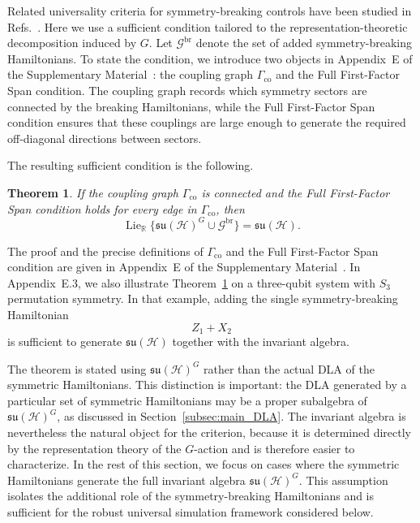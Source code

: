 \documentclass[10pt,twocolumn,superscriptaddress,aps,amsmath,amssymb,citeautoscript,floatfix,prx,longbibliography]{revtex4-2}
\newcounter{alg}
\newtheorem{theorem}{Theorem}
\theoremstyle{plain}
\theoremstyle{plain}
\theoremstyle{plain}
\theoremstyle{plain}
\theoremstyle{plain}
\theoremstyle{plain}
\begin{document}
Related universality criteria for symmetry-breaking controls have been studied in Refs.~\cite{Hu2025, AlbertiniDAlessandro2025}. Here we use a sufficient condition tailored to the representation-theoretic decomposition induced by $G$. Let $\mathcal G^{\mathrm{br}}$ denote the set of added symmetry-breaking Hamiltonians. To state the condition, we introduce two objects in Appendix~E of the Supplementary Material~\cite{SuppMat}: the coupling graph $\Gamma_{\mathrm{co}}$ and the Full First-Factor Span condition. The coupling graph records which symmetry sectors are connected by the breaking Hamiltonians, while the Full First-Factor Span condition ensures that these couplings are large enough to generate the required off-diagonal directions between sectors.

The resulting sufficient condition is the following.

\begin{theorem}\label{thm:breakers_suff_cond}
If the coupling graph $\Gamma_{\mathrm{co}}$ is connected and the Full First-Factor Span condition holds for every edge in $\Gamma_{\mathrm{co}}$, then
$$
    \operatorname{Lie}_{\mathbb R}
    \{\mathfrak{su}(\mathcal H)^G\cup\mathcal G^{\mathrm{br}}\}
    =
    \mathfrak{su}(\mathcal H).
$$
\end{theorem}

The proof and the precise definitions of $\Gamma_{\mathrm{co}}$ and the Full First-Factor Span condition are given in Appendix~E of the Supplementary Material~\cite{SuppMat}. In Appendix~E.3, we also illustrate Theorem~\ref{thm:breakers_suff_cond} on a three-qubit system with $S_3$ permutation symmetry. In that example, adding the single symmetry-breaking Hamiltonian
$$
    Z_1+X_2
$$
is sufficient to generate $\mathfrak{su}(\mathcal H)$ together with the invariant algebra.

The theorem is stated using $\mathfrak{su}(\mathcal H)^G$ rather than the actual DLA of the symmetric Hamiltonians. This distinction is important: the DLA generated by a particular set of symmetric Hamiltonians may be a proper subalgebra of $\mathfrak{su}(\mathcal H)^G$, as discussed in Section~\ref{subsec:main_DLA}. The invariant algebra is nevertheless the natural object for the criterion, because it is determined directly by the representation theory of the $G$-action and is therefore easier to characterize. In the rest of this section, we focus on cases where the symmetric Hamiltonians generate the full invariant algebra $\mathfrak{su}(\mathcal H)^G$. This assumption isolates the additional role of the symmetry-breaking Hamiltonians and is sufficient for the robust universal simulation framework considered below.
\end{document}
